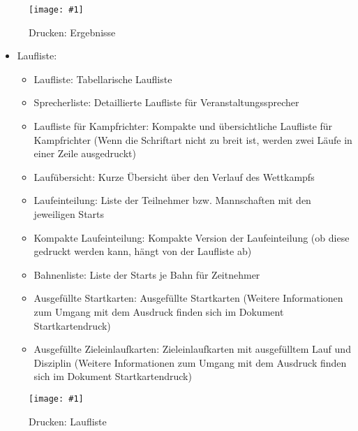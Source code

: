 \documentclass[11pt,a4paper,twoside,ngerman]{article}
\newcommand{\hsmimage}[3]{\begin{figure}[!ht]\centering\texttt{[image: \#1]}\caption{#3}\end{figure}}
\begin{document}
\hsmimage{pics/panel-drucken-ergebnisse}{.80\textwidth}{Drucken: Ergebnisse}

\begin{itemize}

\item Laufliste:
\begin{itemize}

\item Laufliste: Tabellarische Laufliste


\item Sprecherliste: Detaillierte Laufliste für Veranstaltungssprecher


\item Laufliste für Kampfrichter: Kompakte und übersichtliche Laufliste für Kampfrichter (Wenn die Schriftart nicht zu breit ist, werden zwei Läufe in einer Zeile ausgedruckt)


\item Laufübersicht: Kurze Übersicht über den Verlauf des Wettkampfs


\item Laufeinteilung: Liste der Teilnehmer bzw. Mannschaften mit den jeweiligen Starts


\item Kompakte Laufeinteilung: Kompakte Version der Laufeinteilung (ob diese gedruckt werden kann, hängt von der Laufliste ab)


\item Bahnenliste: Liste der Starts je Bahn für Zeitnehmer


\item Ausgefüllte Startkarten: Ausgefüllte Startkarten (Weitere Informationen zum Umgang mit dem Ausdruck finden sich im Dokument \glqq{}Startkartendruck\grqq{})


\item Ausgefüllte Zieleinlaufkarten: Zieleinlaufkarten mit ausgefülltem Lauf und Disziplin (Weitere Informationen zum Umgang mit dem Ausdruck finden sich im Dokument \glqq{}Startkartendruck\grqq{})


\end{itemize}



\end{itemize}

\hsmimage{pics/panel-drucken-laufliste}{.80\textwidth}{Drucken: Laufliste}
\end{document}
